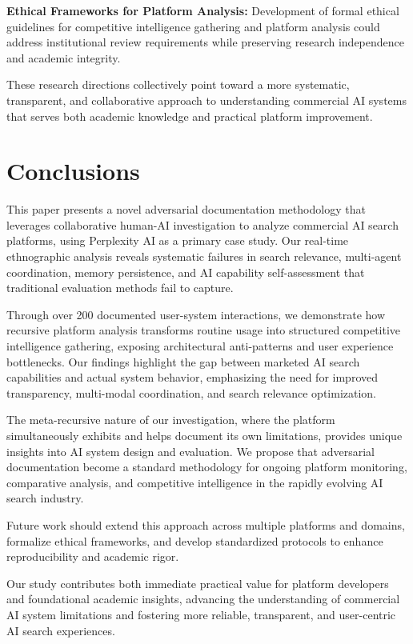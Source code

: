 \documentclass[12pt]{article}
\begin{document}
\textbf{Ethical Frameworks for Platform Analysis:} Development of formal ethical guidelines for competitive intelligence gathering and platform analysis could address institutional review requirements while preserving research independence and academic integrity.

These research directions collectively point toward a more systematic, transparent, and collaborative approach to understanding commercial AI systems that serves both academic knowledge and practical platform improvement.

\section{Conclusions}

This paper presents a novel adversarial documentation methodology that leverages collaborative human-AI investigation to analyze commercial AI search platforms, using Perplexity AI as a primary case study. Our real-time ethnographic analysis reveals systematic failures in search relevance, multi-agent coordination, memory persistence, and AI capability self-assessment that traditional evaluation methods fail to capture.

Through over 200 documented user-system interactions, we demonstrate how recursive platform analysis transforms routine usage into structured competitive intelligence gathering, exposing architectural anti-patterns and user experience bottlenecks. Our findings highlight the gap between marketed AI search capabilities and actual system behavior, emphasizing the need for improved transparency, multi-modal coordination, and search relevance optimization.

The meta-recursive nature of our investigation, where the platform simultaneously exhibits and helps document its own limitations, provides unique insights into AI system design and evaluation. We propose that adversarial documentation become a standard methodology for ongoing platform monitoring, comparative analysis, and competitive intelligence in the rapidly evolving AI search industry.

Future work should extend this approach across multiple platforms and domains, formalize ethical frameworks, and develop standardized protocols to enhance reproducibility and academic rigor.

Our study contributes both immediate practical value for platform developers and foundational academic insights, advancing the understanding of commercial AI system limitations and fostering more reliable, transparent, and user-centric AI search experiences.
\end{document}
